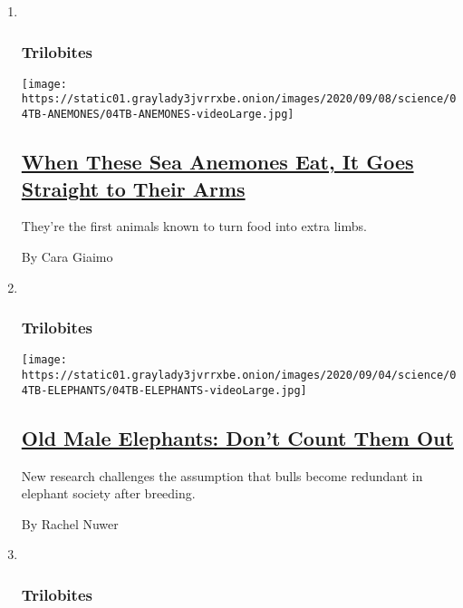 \begin{enumerate}
\def\labelenumi{\arabic{enumi}.}
\item ~
  \hypertarget{trilobites-1}{%
  \subsubsection{Trilobites}\label{trilobites-1}}

  \texttt{[image: https://static01.graylady3jvrrxbe.onion/images/2020/09/08/science/04TB-ANEMONES/04TB-ANEMONES-videoLarge.jpg]}

  \hypertarget{when-these-sea-anemones-eat-it-goes-straight-to-their-arms}{%
  \subsection{\texorpdfstring{\href{/2020/09/05/science/sea-anemones-arms.html}{When
  These Sea Anemones Eat, It Goes Straight to Their
  Arms}}{When These Sea Anemones Eat, It Goes Straight to Their Arms}}\label{when-these-sea-anemones-eat-it-goes-straight-to-their-arms}}

  They're the first animals known to turn food into extra limbs.

  By Cara Giaimo
\item ~
  \hypertarget{trilobites-2}{%
  \subsubsection{Trilobites}\label{trilobites-2}}

  \texttt{[image: https://static01.graylady3jvrrxbe.onion/images/2020/09/04/science/04TB-ELEPHANTS/04TB-ELEPHANTS-videoLarge.jpg]}

  \hypertarget{old-male-elephants-dont-count-them-out}{%
  \subsection{\texorpdfstring{\href{/2020/09/04/science/male-elephants-bulls.html}{Old
  Male Elephants: Don't Count Them
  Out}}{Old Male Elephants: Don't Count Them Out}}\label{old-male-elephants-dont-count-them-out}}

  New research challenges the assumption that bulls become redundant in
  elephant society after breeding.

  By Rachel Nuwer
\item ~
  \hypertarget{trilobites-3}{%
  \subsubsection{Trilobites}\label{trilobites-3}}


\end{enumerate}
